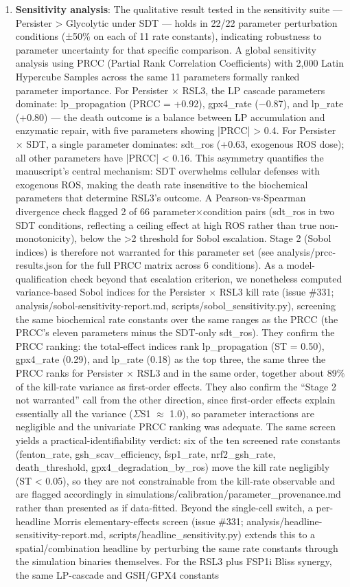\documentclass[11pt,twoside,openright]{report}
\begin{document}
\begin{enumerate}
\item \textbf{Sensitivity analysis}: The qualitative result tested in the sensitivity suite --- Persister > Glycolytic under SDT --- holds in 22/22 parameter perturbation conditions (±50\% on each of 11 rate constants), indicating robustness to parameter uncertainty for that specific comparison. A global sensitivity analysis using PRCC (Partial Rank Correlation Coefficients) with 2,000 Latin Hypercube Samples across the same 11 parameters formally ranked parameter importance. For Persister $\times$ RSL3, the LP cascade parameters dominate: lp\_propagation (PRCC = +0.92), gpx4\_rate ($-$0.87), and lp\_rate (+0.80) --- the death outcome is a balance between LP accumulation and enzymatic repair, with five parameters showing |PRCC| > 0.4. For Persister $\times$ SDT, a single parameter dominates: sdt\_ros (+0.63, exogenous ROS dose); all other parameters have |PRCC| < 0.16. This asymmetry quantifies the manuscript's central mechanism: SDT overwhelms cellular defenses with exogenous ROS, making the death rate insensitive to the biochemical parameters that determine RSL3's outcome. A Pearson-vs-Spearman divergence check flagged 2 of 66 parameter$\times$condition pairs (sdt\_ros in two SDT conditions, reflecting a ceiling effect at high ROS rather than true non-monotonicity), below the >2 threshold for Sobol escalation. Stage 2 (Sobol indices) is therefore not warranted for this parameter set (see analysis/prcc-results.json for the full PRCC matrix across 6 conditions). As a model-qualification check beyond that escalation criterion, we nonetheless computed variance-based Sobol indices for the Persister $\times$ RSL3 kill rate (issue \#331; analysis/sobol-sensitivity-report.md, scripts/sobol\_sensitivity.py), screening the same biochemical rate constants over the same ranges as the PRCC (the PRCC's eleven parameters minus the SDT-only sdt\_ros). They confirm the PRCC ranking: the total-effect indices rank lp\_propagation (ST = 0.50), gpx4\_rate (0.29), and lp\_rate (0.18) as the top three, the same three the PRCC ranks for Persister $\times$ RSL3 and in the same order, together about 89\% of the kill-rate variance as first-order effects. They also confirm the ``Stage 2 not warranted'' call from the other direction, since first-order effects explain essentially all the variance ($\Sigma$S1 $\approx$ 1.0), so parameter interactions are negligible and the univariate PRCC ranking was adequate. The same screen yields a practical-identifiability verdict: six of the ten screened rate constants (fenton\_rate, gsh\_scav\_efficiency, fsp1\_rate, nrf2\_gsh\_rate, death\_threshold, gpx4\_degradation\_by\_ros) move the kill rate negligibly (ST < 0.05), so they are not constrainable from the kill-rate observable and are flagged accordingly in simulations/calibration/parameter\_provenance.md rather than presented as if data-fitted. Beyond the single-cell switch, a per-headline Morris elementary-effects screen (issue \#331; analysis/headline-sensitivity-report.md, scripts/headline\_sensitivity.py) extends this to a spatial/combination headline by perturbing the same rate constants through the simulation binaries themselves. For the RSL3 plus FSP1i Bliss synergy, the same LP-cascade and GSH/GPX4 constants 
\end{enumerate}
\end{document}
